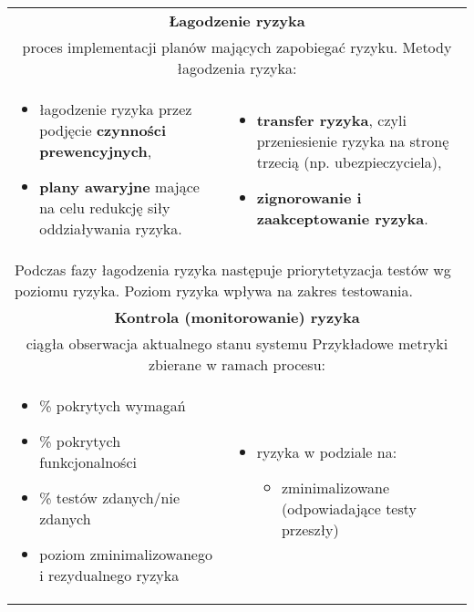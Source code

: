 \documentclass[../main.tex]{subfiles}
\begin{document}
\begin{table}[H]
\begin{center}
\begin{tabular}{| p{8cm}  p{8cm} |}
                \hline
                \hline
                \multicolumn{2}{|c|}{\textbf{Łagodzenie ryzyka}}\\
                \multicolumn{2}{|c|}{proces implementacji planów mających zapobiegać ryzyku. Metody łagodzenia ryzyka:}\\
                \hline
                \begin{itemize}
                    \item łagodzenie ryzyka przez podjęcie \textbf{czynności prewencyjnych},
                    \item \textbf{plany awaryjne} mające na celu redukcję siły oddziaływania ryzyka.
                \end{itemize}
                &
                \begin{itemize}
                    \item \textbf{transfer ryzyka}, czyli przeniesienie ryzyka na stronę trzecią (np. ubezpieczyciela),
                    \item \textbf{zignorowanie i zaakceptowanie ryzyka}.
                \end{itemize}\\
                \multicolumn{2}{|p{16cm}|}{Podczas fazy łagodzenia ryzyka następuje priorytetyzacja testów wg poziomu ryzyka. Poziom ryzyka wpływa na zakres testowania.}\\
                \hline
                \hline
                \multicolumn{2}{|c|}{\textbf{Kontrola (monitorowanie) ryzyka}}\\
                \multicolumn{2}{|c|}{ciągła obserwacja aktualnego stanu systemu Przykładowe metryki zbierane w ramach procesu:}\\
                \hline
                \begin{itemize}
                    \item \% pokrytych wymagań
                    \item \% pokrytych funkcjonalności
                    \item \% testów zdanych/nie zdanych
                    \item poziom zminimalizowanego i rezydualnego ryzyka
                \end{itemize}
                &
                \begin{itemize}
                    \item ryzyka w podziale na:
                    \begin{itemize}
                        \item zminimalizowane (odpowiadające testy przeszły)

\end{itemize}
\end{itemize}
\end{tabular}
\end{center}
\end{table}
\end{document}

